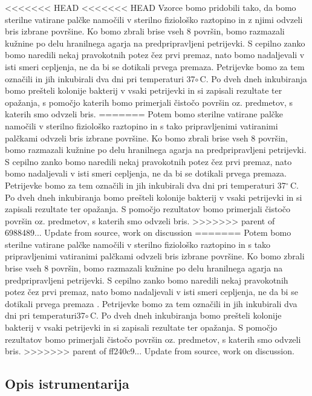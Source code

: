 \documentclass[12pt, a4paper, oneside]{report}
\begin{document}
<<<<<<< HEAD
<<<<<<< HEAD
Vzorce bomo pridobili tako, da bomo sterilne vatirane palčke namočili v sterilno fiziološko raztopino in z njimi odvzeli bris izbrane površine. Ko bomo zbrali brise vseh 8 površin, bomo razmazali kužnine po delu hranilnega agarja na predpripravljeni petrijevki. S cepilno zanko bomo naredili nekaj pravokotnih potez čez prvi premaz, nato bomo nadaljevali v isti smeri cepljenja, ne da bi se dotikali prvega premaza. Petrijevke bomo za tem označili in jih inkubirali dva dni pri temperaturi 37$\circ$\,C. Po dveh dneh inkubiranja bomo prešteli kolonije bakterij v vsaki petrijevki in si zapisali rezultate ter opažanja, s pomočjo katerih bomo primerjali čistočo površin oz. predmetov, s katerih smo odvzeli bris.
=======
Potem bomo sterilne vatirane palčke namočili v sterilno fiziološko raztopino in s tako pripravljenimi vatiranimi palčkami odvzeli bris izbrane površine. Ko bomo zbrali brise vseh 8 površin, bomo razmazali kužnine po delu hranilnega agarja na predpripravljeni petrijevki. S cepilno zanko bomo naredili nekaj pravokotnih potez čez prvi premaz, nato bomo nadaljevali v isti smeri cepljenja, ne da bi se dotikali prvega premaza. Petrijevke bomo za tem označili in jih inkubirali dva dni pri temperaturi 37$^\circ$\,C. Po dveh dneh inkubiranja bomo prešteli kolonije bakterij v vsaki petrijevki in si zapisali rezultate ter opažanja. S pomočjo rezultatov bomo primerjali čistočo površin oz. predmetov, s katerih smo odvzeli bris.
>>>>>>> parent of 6988489... Update from source, work on discussion
=======
Potem bomo sterilne vatirane palčke namočili v sterilno fiziološko raztopino in s tako pripravljenimi vatiranimi palčkami odvzeli bris izbrane površine.  Ko bomo zbrali brise vseh 8  površin, bomo razmazali kužnine po delu hranilnega agarja na predpripravljeni petrijevki. S cepilno zanko bomo naredili nekaj pravokotnih potez čez prvi premaz, nato bomo nadaljevali v isti smeri cepljenja, ne da bi se dotikali  prvega premaza . Petrijevke bomo za tem označili in jih inkubirali dva dni  pri temperaturi37$\circ$\,C. Po dveh dneh inkubiranja bomo prešteli kolonije bakterij v vsaki petrijevki in si zapisali rezultate ter opažanja. S pomočjo rezultatov bomo primerjali čistočo površin oz. predmetov, s katerih smo odvzeli bris.
>>>>>>> parent of ff240c9... Update from source, work on discussion.

\subsection{Opis istrumentarija}
\end{document}

